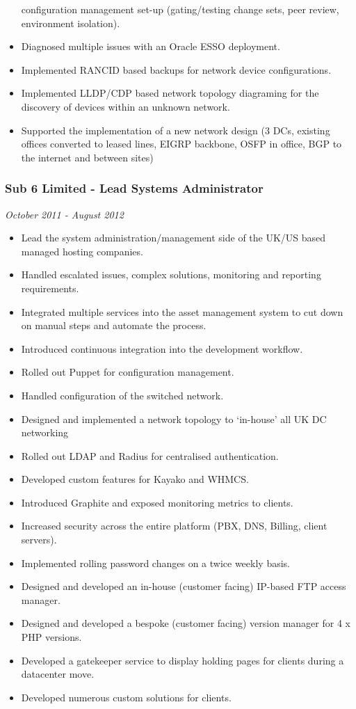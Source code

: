 \begin{itemize}
  configuration management set-up (gating/testing change sets, peer
  review, environment isolation).
\item
  Diagnosed multiple issues with an Oracle ESSO deployment.
\item
  Implemented RANCID based backups for network device configurations.
\item
  Implemented LLDP/CDP based network topology diagraming for the
  discovery of devices within an unknown network.
\item
  Supported the implementation of a new network design (3 DCs, existing
  offices converted to leased lines, EIGRP backbone, OSFP in office, BGP
  to the internet and between sites)
\end{itemize}

\subsubsection{Sub 6 Limited - Lead Systems
Administrator}\label{sub-6-limited---lead-systems-administrator}

\emph{October 2011 - August 2012}

\begin{itemize}
\itemsep1pt\parskip0pt
\item
  Lead the system administration/management side of the UK/US based
  managed hosting companies.
\item
  Handled escalated issues, complex solutions, monitoring and reporting
  requirements.
\item
  Integrated multiple services into the asset management system to cut
  down on manual steps and automate the process.
\item
  Introduced continuous integration into the development workflow.
\item
  Rolled out Puppet for configuration management.
\item
  Handled configuration of the switched network.
\item
  Designed and implemented a network topology to `in-house' all UK DC
  networking
\item
  Rolled out LDAP and Radius for centralised authentication.
\item
  Developed custom features for Kayako and WHMCS.
\item
  Introduced Graphite and exposed monitoring metrics to clients.
\item
  Increased security across the entire platform (PBX, DNS, Billing,
  client servers).
\item
  Implemented rolling password changes on a twice weekly basis.
\item
  Designed and developed an in-house (customer facing) IP-based FTP
  access manager.
\item
  Designed and developed a bespoke (customer facing) version manager for
  4 x PHP versions.
\item
  Developed a gatekeeper service to display holding pages for clients
  during a datacenter move.
\item
  Developed numerous custom solutions for clients.
\end{itemize}

